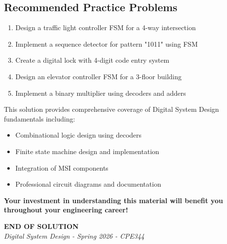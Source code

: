 \documentclass[12pt,a4paper]{article}
\begin{document}
\subsection{Recommended Practice Problems}

\begin{enumerate}
  \item Design a traffic light controller FSM for a 4-way intersection
  \item Implement a sequence detector for pattern "1011" using FSM
  \item Create a digital lock with 4-digit code entry system
  \item Design an elevator controller FSM for a 3-floor building
  \item Implement a binary multiplier using decoders and adders
\end{enumerate}

\begin{tcolorbox}[colback=red!5!white,colframe=red!75!black,title=Final Note]
This solution provides comprehensive coverage of Digital System Design fundamentals including:
\begin{itemize}
  \item Combinational logic design using decoders
  \item Finite state machine design and implementation
  \item Integration of MSI components
  \item Professional circuit diagrams and documentation
\end{itemize}

\textbf{Your investment in understanding this material will benefit you throughout your engineering career!}
\end{tcolorbox}

\vfill
\begin{center}
\textbf{\Large END OF SOLUTION}\\
\vspace{0.5cm}
\textit{Digital System Design - Spring 2026 - CPE344}
\end{center}
\end{document}

